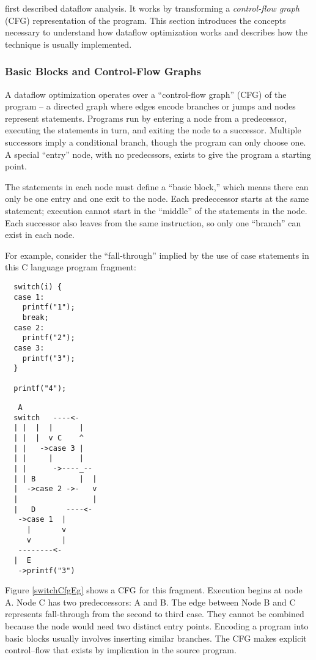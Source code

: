 \documentclass[11pt]{article}
\begin{document}
\citet{SoAndSo} first described dataflow
analysis. It works by transforming a \emph{control-flow graph} (CFG)
representation of the program. This section introduces the concepts
necessary to understand how dataflow optimization works and describes
how the technique is usually implemented.

\subsubsection{Basic Blocks and Control-Flow Graphs}

A dataflow optimization operates over a ``control-flow graph'' (CFG)
of the program -- a directed graph where edges encode branches or
jumps and nodes represent statements. Programs run by entering a node
from a predecessor, executing the statements in turn, and exiting the
node to a successor. Multiple successors imply a conditional branch,
though the program can only choose one. A special ``entry'' node, with
no predecssors, exists to give the program a starting point.

The statements in each node must define a ``basic block,'' which means
there can only be one entry and one exit to the node. Each 
predeccessor starts at the same statement; execution cannot start in
the ``middle'' of the statements in the node. Each successor also
leaves from the same instruction, so only one ``branch'' can exist in
each node.

For example, consider the ``fall-through'' implied by the use of case
statements in this C language program fragment:
\begin{verbatim}
  switch(i) {
  case 1:
    printf("1");
    break;
  case 2:
    printf("2");
  case 3:
    printf("3");
  }

  printf("4");
\end{verbatim}
\begin{verbatim}
   A
  switch   ----<-
  | |  |  |      |
  | |  |  v C    ^
  | |   ->case 3 |
  | |     |      |
  | |      ->----_-- 
  | | B          |  |
  |  ->case 2 ->-   v
  |                 |
  |   D       ----<-
   ->case 1  |
     |       v
     v       |
   --------<-      
  |  E
   ->printf("3")
\end{verbatim}
Figure \ref{switchCfgEg} shows a CFG for this fragment. Execution
begins at node A. Node C has two predeccessors: A and B. The edge
between Node B and C represents fall-through from the second to third
case. They cannot be combined because the node would need two distinct
entry points. Encoding a program into basic blocks usually involves
inserting similar branches. The CFG makes explicit control--flow that
exists by implication in the source program.
\end{document}
